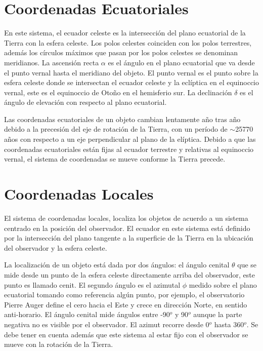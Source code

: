 
\section{Coordenadas Ecuatoriales}\label{apendice:ecuatorial}

En este sistema, el ecuador celeste es la intersección del plano ecuatorial de la Tierra con la esfera celeste. Los polos celestes coinciden con los polos terrestres, además los círculos máximos que pasan por los polos celestes se denominan meridianos. La ascensión recta $\alpha$ es el ángulo en el plano ecuatorial que va desde el punto vernal hasta el meridiano del objeto. El punto vernal es el punto sobre la esfera celeste donde se intersectan el ecuador celeste y la eclíptica en el equinoccio vernal, este es el equinoccio de Otoño en el hemisferio sur. La declinación $\delta$ es el ángulo de elevación con respecto al plano ecuatorial.


Las coordenadas ecuatoriales de un objeto cambian lentamente año tras año debido a la precesión del eje de rotación de la Tierra, con un período de $\sim$25770 años con respecto a un eje perpendicular al plano de la elíptica. Debido a que las coordenadas ecuatoriales están fijas al ecuador terrestre y relativas al equinoccio vernal, el sistema de coordenadas se mueve conforme la Tierra precede. 

\section{Coordenadas Locales} \label{apendice:local}

El sistema de coordenadas locales, localiza los objetos de acuerdo a un sistema centrado en la posición del observador. El ecuador en este sistema está definido por la intersección del plano tangente a la superficie de la Tierra en la ubicación del observador y la esfera celeste. 


La localización de un objeto está dada por dos ángulos: el ángulo cenital $\theta$ que se mide desde un punto de la esfera celeste directamente arriba del observador, este punto es llamado  cenit. El segundo ángulo es el azimutal $\phi$ medido sobre el plano ecuatorial tomando como referencia algún punto, por ejemplo, el observatorio Pierre Auger define el cero hacia el Este y crece en dirección Norte, en sentido anti-horario. El ángulo cenital mide ángulos entre -90$^o$ y 90$^o$ aunque la parte negativa no es visible por el observador. El azimut recorre desde 0$^o$ hasta 360$^o$. Se debe tener en cuenta además que este sistema al estar fijo con el observador se mueve con la rotación de la Tierra.


